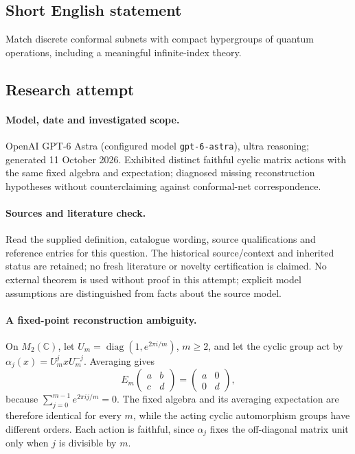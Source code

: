 \documentclass[11pt]{article}
\begin{document}
\subsection{Short English statement}
Match discrete conformal subnets with compact hypergroups of quantum operations, including a meaningful infinite-index theory.
\subsection{Research attempt}
\paragraph{Model, date and investigated scope.}
OpenAI GPT-6 Astra (configured model \texttt{gpt-6-astra}), ultra reasoning; generated 11 October 2026. Exhibited distinct faithful cyclic matrix actions with the same fixed algebra and expectation; diagnosed missing reconstruction hypotheses without counterclaiming against conformal-net correspondence.

\paragraph{Sources and literature check.}
Read the supplied definition, catalogue wording, source qualifications and reference entries for this question. The historical source/context and inherited status are retained; no fresh literature or novelty certification is claimed. No external theorem is used without proof in this attempt; explicit model assumptions are distinguished from facts about the source model.

\paragraph{A fixed-point reconstruction ambiguity.} On \(M_2(\mathbb C)\), let \(U_m=\operatorname{diag}(1,e^{2\pi i/m})\), \(m\ge2\), and let the cyclic group act by \(\alpha_j(x)=U_m^jxU_m^{-j}\). Averaging gives
\[
 E_m\begin{pmatrix}a&b\\c&d\end{pmatrix}
 =\begin{pmatrix}a&0\\0&d\end{pmatrix},
\]
because \(\sum_{j=0}^{m-1}e^{2\pi ij/m}=0\). The fixed algebra and its averaging expectation are therefore identical for every \(m\), while the acting cyclic automorphism groups have different orders. Each action is faithful, since \(\alpha_j\) fixes the off-diagonal matrix unit only when \(j\) is divisible by \(m\).
\end{document}
